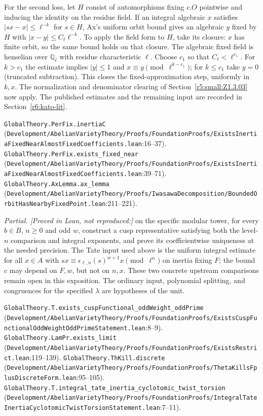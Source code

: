 For the second loss, let $H$ consist of automorphisms fixing $c.O$ pointwise and inducing the identity on the residue field. If an integral algebraic $x$ satisfies $|s x-x|\le\ell^{-k}$ for $s\in H$, Ax's uniform orbit bound gives an algebraic $y$ fixed by $H$ with $|x-y|\le C_\ell\ell^{-k}$. To apply the field form to $H$, take its closure: $x$ has finite orbit, so the same bound holds on that closure. The algebraic fixed field is henselian over $\mathbb Q_\ell$ with residue characteristic $\ell$. Choose $c_1$ so that $C_\ell<\ell^{c_1}$. For $k>c_1$ the estimate implies $|y|\le1$ and $x\equiv y\pmod{\ell^{k-c_1}}$; for $k\le c_1$ take $y=0$ (truncated subtraction). This closes the fixed-approximation step, uniformly in $k,x$. The normalization and denominator clearing of Section~\ref{r5:small:Z1.3.03} now apply. The published estimates and the remaining input are recorded in Section~\ref{r6:kato-lit}.
\par{\footnotesize \nolinkurl{GlobalTheory.PerFix.inertiaC} (\nolinkurl{Development/AbelianVarietyTheory/Proofs/FoundationProofs/ExistsInertiaFixedNearAlmostFixedCoefficients.lean}\allowbreak:16--37). \nolinkurl{GlobalTheory.PerFix.exists_fixed_near} (\nolinkurl{Development/AbelianVarietyTheory/Proofs/FoundationProofs/ExistsInertiaFixedNearAlmostFixedCoefficients.lean}\allowbreak:39--71). \nolinkurl{GlobalTheory.AxLemma.ax_lemma} (\nolinkurl{Development/AbelianVarietyTheory/Proofs/IwasawaDecomposition/BoundedOrbitHasNearbyFixedPoint.lean}\allowbreak:211--221).\par}

\emph{Partial. [Proved in Lean, not reproduced:]} on the specific modular tower, for every $b\in B$, $n\ge0$ and odd $w$, construct a cusp representative satisfying both the level-$n$ comparison and integral exponents, and prove its coefficientwise uniqueness at the needed precision. The Tate input used above is the uniform integral estimate for all $x\in A$ with $s x\equiv\epsilon_{\ell,n}(s)^{w+1}x\pmod{\ell^n}$ on inertia fixing $F$; the bound $c$ may depend on $F,w$, but not on $n,x$. These two concrete upstream comparisons remain open in this exposition. The ordinary input, polynomial splitting, and congruences for the specified $\lambda$ are hypotheses of the unit.
\par{\footnotesize \nolinkurl{GlobalTheory.T.exists_cuspFunctional_oddWeight_oddPrime} (\nolinkurl{Development/AbelianVarietyTheory/Proofs/FoundationProofs/ExistsCuspFunctionalOddWeightOddPrimeStatement.lean}\allowbreak:8--9). \nolinkurl{GlobalTheory.LamPr.exists_limit} (\nolinkurl{Development/AbelianVarietyTheory/Proofs/FoundationProofs/ExistsRestrict.lean}\allowbreak:119--139). \nolinkurl{GlobalTheory.ThKill.discrete} (\nolinkurl{Development/AbelianVarietyTheory/Proofs/FoundationProofs/ThetaKillsFplusDiscreteForm.lean}\allowbreak:95--105). \nolinkurl{GlobalTheory.T.integral_tate_inertia_cyclotomic_twist_torsion} (\nolinkurl{Development/AbelianVarietyTheory/Proofs/FoundationProofs/IntegralTateInertiaCyclotomicTwistTorsionStatement.lean}\allowbreak:7--11).\par}


